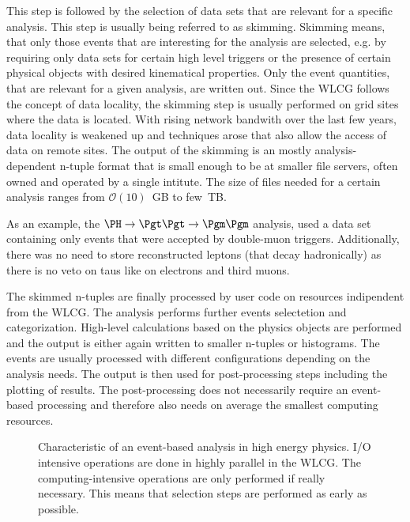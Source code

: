 \documentclass[3p]{elsarticle}
\begin{document}
This step is followed by the selection of data sets that are relevant for a specific analysis. This step is usually being referred to as skimming. Skimming means, that only those events that are interesting for the analysis are selected, e.g. by requiring only data sets for certain high level triggers or the presence of certain physical objects with desired kinematical properties. Only the event quantities, that are relevant for a given analysis, are written out. Since the WLCG follows the concept of data locality, the skimming step is usually performed on grid sites where the data is located. With rising network bandwith over the last few years, data locality is weakened up and techniques arose that also allow the access of data on remote sites. The output of the skimming is an mostly analysis-dependent n-tuple format that is small enough to be at smaller file servers, often owned and operated by a single intitute. The size of files needed for a certain analysis ranges from $\mathcal O(10)$~GB to few~TB.

As an example, the $\PH\to\Pgt\Pgt\to\Pgm\Pgm$ analysis, used a data set containing only events that were accepted by double-muon triggers. Additionally, there was no need to store reconstructed \Pgt leptons (that decay hadronically) as there is no veto on taus like on electrons and third muons.

The skimmed n-tuples are finally processed by user code on resources indipendent from the WLCG. The analysis performs further events selectetion and categorization. High-level calculations based on the physics objects are performed and the output is either again written to smaller n-tuples or histograms. The events are usually processed with different configurations depending on the analysis needs. The output is then used for post-processing steps including the plotting of results. The post-processing does not necessarily require an event-based processing and therefore also needs on average the smallest computing resources.


\begin{figure}[p]
\centering 
\caption[Characteristics of an event-based analysis in high energy physics]{Characteristic of an event-based analysis in high energy physics. I/O intensive operations are done in highly parallel in the WLCG. The computing-intensive operations are only performed if really necessary. This means that selection steps are performed as early as possible.}
\label{figure_analysis_steps}
\end{figure}
\clearpage
\end{document}
